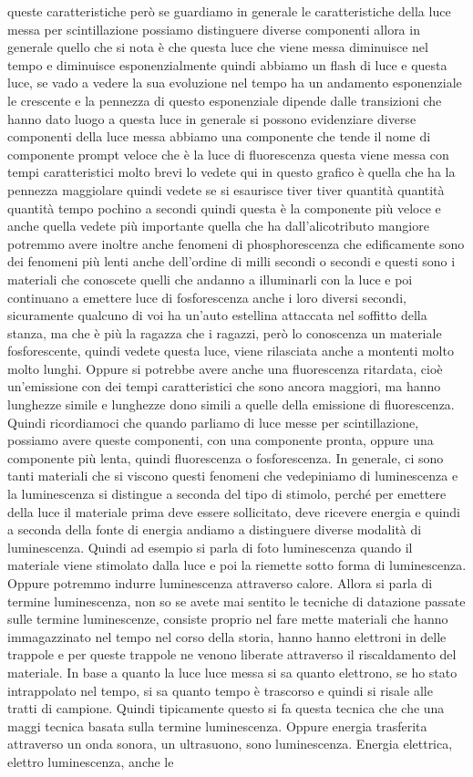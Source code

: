 queste caratteristiche però se guardiamo in generale le caratteristiche della luce messa per scintillazione possiamo distinguere diverse componenti allora in generale quello che si nota è che questa luce che viene messa diminuisce nel tempo e diminuisce esponenzialmente quindi abbiamo un flash di luce e questa luce, se vado a vedere la sua evoluzione nel tempo ha un andamento esponenziale le crescente e la pennezza di questo esponenziale dipende dalle transizioni che hanno dato luogo a questa luce in generale si possono evidenziare diverse componenti della luce messa abbiamo una componente che tende il nome di componente prompt veloce che è la luce di fluorescenza questa viene messa con tempi caratteristici molto brevi lo vedete qui in questo grafico è quella che ha la pennezza maggiolare quindi vedete se si esaurisce tiver tiver quantità quantità quantità tempo pochino a secondi quindi questa è la componente più veloce e anche quella vedete più importante quella che ha dall'alicotributo mangiore potremmo avere inoltre anche fenomeni di phosphorescenza che edificamente sono dei fenomeni più lenti anche dell'ordine di milli secondi o secondi e questi sono i materiali che conoscete quelli che andanno a illuminarli con la luce e poi continuano a emettere luce di fosforescenza anche i loro diversi secondi, sicuramente qualcuno di voi ha un'auto estellina attaccata nel soffitto della stanza, ma che è più la ragazza che i ragazzi, però lo conoscenza un materiale fosforescente, quindi vedete questa luce, viene rilasciata anche a montenti molto molto lunghi. Oppure si potrebbe avere anche una fluorescenza ritardata, cioè un'emissione con dei tempi caratteristici che sono ancora maggiori, ma hanno lunghezze simile e lunghezze dono simili a quelle della emissione di fluorescenza. Quindi ricordiamoci che quando parliamo di luce messe per scintillazione, possiamo avere queste componenti, con una componente pronta, oppure una componente più lenta, quindi fluorescenza o fosforescenza. In generale, ci sono tanti materiali che si viscono questi fenomeni che vedepiniamo di luminescenza e la luminescenza si distingue a seconda del tipo di stimolo, perché per emettere della luce il materiale prima deve essere sollicitato, deve ricevere energia e quindi a seconda della fonte di energia andiamo a distinguere diverse modalità di luminescenza. Quindi ad esempio si parla di foto luminescenza quando il materiale viene stimolato dalla luce e poi la riemette sotto forma di luminescenza. Oppure potremmo indurre luminescenza attraverso calore. Allora si parla di termine luminescenza, non so se avete mai sentito le tecniche di datazione passate sulle termine luminescenze, consiste proprio nel fare mette materiali che hanno immagazzinato nel tempo nel corso della storia, hanno hanno elettroni in delle trappole e per queste trappole ne venono liberate attraverso il riscaldamento del materiale. In base a quanto la luce luce messa si sa quanto elettrono, se ho stato intrappolato nel tempo, si sa quanto tempo è trascorso e quindi si risale alle tratti di campione. Quindi tipicamente questo si fa questa tecnica che che una maggi tecnica basata sulla termine luminescenza. Oppure energia trasferita attraverso un onda sonora, un ultrasuono, sono luminescenza. Energia elettrica, elettro luminescenza, anche le 